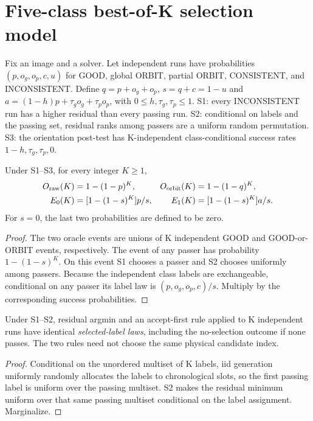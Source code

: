 
\section{Five-class best-of-K selection model}
Fix an image and a solver. Let independent runs have probabilities
\((p,o_g,o_p,c,u)\) for GOOD, global ORBIT, partial ORBIT, CONSISTENT,
and INCONSISTENT. Define \(q=p+o_g+o_p\), \(s=q+c=1-u\) and
\(a=(1-h)p+\tau_g o_g+\tau_p o_p\), with
\(0\le h,\tau_g,\tau_p\le1\).
S1: every INCONSISTENT run has a higher residual than every passing
run. S2: conditional on labels and the passing set, residual ranks
among passers are a uniform random permutation.
S3: the orientation post-test has K-independent class-conditional
success rates \(1-h,\tau_g,\tau_p,0\).

\begin{proposition}
Under S1--S3, for every integer \(K\ge1\),
\[
\begin{aligned}
 O_{\rm raw}(K)&=1-(1-p)^K,&
 O_{\rm orbit}(K)&=1-(1-q)^K,\\
 E_0(K)&=[1-(1-s)^K]p/s,&
 E_1(K)&=[1-(1-s)^K]a/s.
\end{aligned}
\]
For \(s=0\), the last two probabilities are defined to be zero.
\end{proposition}
\begin{proof}
The two oracle events are unions of K independent GOOD and
GOOD-or-ORBIT events, respectively. The event of any passer has
probability \(1-(1-s)^K\). On this event S1 chooses a passer and
S2 chooses uniformly among passers. Because the independent
class labels are exchangeable, conditional on any passer its
label law is \((p,o_g,o_p,c)/s\). Multiply by the corresponding
success probabilities.
\end{proof}

\begin{proposition}
Under S1--S2, residual argmin and an accept-first rule applied
to K independent runs have identical \emph{selected-label laws},
including the no-selection outcome if none passes. The two
rules need not choose the same physical candidate index.
\end{proposition}
\begin{proof}
Conditional on the unordered multiset of K labels, iid generation
uniformly randomly allocates the labels to chronological slots,
so the first passing label is uniform over the passing multiset.
S2 makes the residual minimum uniform over that same passing
multiset conditional on the label assignment. Marginalize.
\end{proof}

